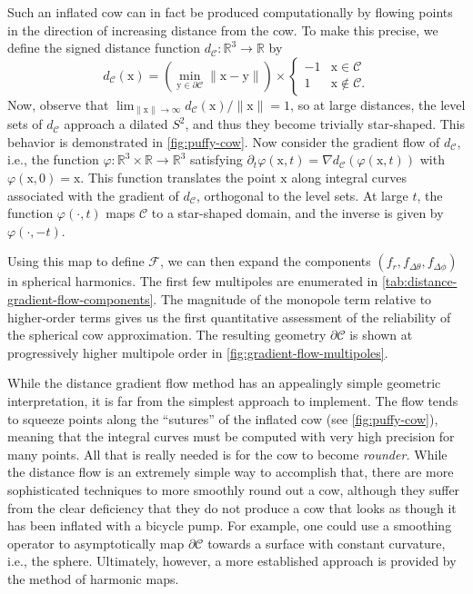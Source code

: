 \documentclass[
    prd, twocolumn, nofootinbib, amsmath, amssymb,
    aps, floatfix, preprintnumbers
]{revtex4-2}
\newcommand{\bb}[1]{\bm{\mathrm{#1}}}
\begin{document}
Such an inflated cow can in fact be produced computationally by flowing points in the direction of increasing distance from the cow. To make this precise, we define the signed distance function $d_{\mathcal C}\colon\mathbb R^3 \to \mathbb R$ by
\begin{equation}
    d_{\mathcal C}(\bb x) = 
        \left(\min_{\bb y\in\partial\mathcal C}\|\bb x - \bb y \|\right)
        \times
        \begin{cases}
            -1 & \bb x\in\mathcal C \\
            1 & \bb x\notin\mathcal C.
        \end{cases}
\end{equation}
Now, observe that $\lim_{\|\bb x\|\to\infty}d_{\mathcal C}(\bb x)/\|\bb x\| = 1$, so at large distances, the level sets of $d_{\mathcal C}$ approach a dilated $S^2$, and thus they become trivially star-shaped. This behavior is demonstrated in \cref{fig:puffy-cow}. Now consider the gradient flow of $d_{\mathcal C}$, i.e., the function $\varphi\colon{\mathbb R^3\times\mathbb R}\to\mathbb R^3$ satisfying $\partial_t\varphi(\bb x, t) = \nabla d_{\mathcal C}(\varphi(\bb x, t))$ with $\varphi(\bb x, 0) = \bb x$. This function translates the point $\bb x$ along integral curves associated with the gradient of $d_{\mathcal C}$, orthogonal to the level sets. At large $t$, the function $\varphi(\cdot, t)$ maps $\mathcal C$ to a star-shaped domain, and the inverse is given by $\varphi(\cdot, -t)$.

Using this map to define $\mathcal F$, we can then expand the components $(f_r, f_{\Delta\theta}, f_{\Delta\phi})$ in spherical harmonics. The first few multipoles are enumerated in \cref{tab:distance-gradient-flow-components}. The magnitude of the monopole term relative to higher-order terms gives us the first quantitative assessment of the reliability of the spherical cow approximation. The resulting geometry $\partial\mathcal C$ is shown at progressively higher multipole order in \cref{fig:gradient-flow-multipoles}.

While the distance gradient flow method has an appealingly simple geometric interpretation, it is far from the simplest approach to implement. The flow tends to squeeze points along the ``sutures'' of the inflated cow (see \cref{fig:puffy-cow}), meaning that the integral curves must be computed with very high precision for many points. All that is really needed is for the cow to become \emph{rounder.} While the distance flow is an extremely simple way to accomplish that, there are more sophisticated techniques to more smoothly round out a cow, although they suffer from the clear deficiency that they do not produce a cow that looks as though it has been inflated with a bicycle pump. For example, one could use a smoothing operator to asymptotically map $\partial\mathcal C$ towards a surface with constant curvature, i.e., the sphere. Ultimately, however, a more established approach is provided by the method of harmonic maps.
\end{document}
